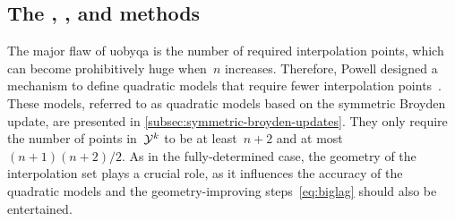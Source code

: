 \subsection{The , , and  methods}
\label{subsec:newuoa-bobyqa-lincoa}

The major flaw of \gls{uobyqa} is the number of required interpolation points, which can become prohibitively huge when~$n$ increases.
Therefore, Powell designed a mechanism to define quadratic models that require fewer interpolation points~\cite{Powell_2004a}.
These models, referred to as quadratic models based on the symmetric Broyden update, are presented in \cref{subsec:symmetric-broyden-updates}.
They only require the number of points in~$\xpt[k]$ to be at least~$n + 2$ and at most~$(n + 1)(n + 2) / 2$.
As in the fully-determined case, the geometry of the interpolation set plays a crucial role, as it influences the accuracy of the quadratic models and the geometry-improving steps~\cref{eq:biglag} should also be entertained.

